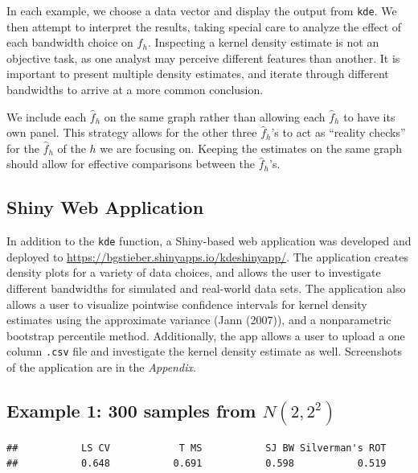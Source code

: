 \documentclass[]{article}
\begin{document}
In each example, we choose a data vector and display the output from
\texttt{kde}. We then attempt to interpret the results, taking special
care to analyze the effect of each bandwidth choice on \(\hat{f}_h\).
Inspecting a kernel density estimate is not an objective task, as one
analyst may perceive different features than another. It is important to
present multiple density estimates, and iterate through different
bandwidths to arrive at a more common conclusion.

We include each \(\hat f_h\) on the same graph rather than allowing each
\(\hat f_h\) to have its own panel. This strategy allows for the other
three \(\hat f_h\)'s to act as ``reality checks'' for the \(\hat f_h\)
of the \(h\) we are focusing on. Keeping the estimates on the same graph
should allow for effective comparisons between the \(\hat f_h\)'s.

\subsection{Shiny Web Application}

In addition to the \texttt{kde} function, a Shiny-based web application
was developed and deployed to
\url{https://bgstieber.shinyapps.io/kdeshinyapp/}. The application
creates density plots for a variety of data choices, and allows the user
to investigate different bandwidths for simulated and real-world data
sets. The application also allows a user to visualize pointwise
confidence intervals for kernel density estimates using the approximate
variance (Jann (2007)), and a nonparametric bootstrap percentile method.
Additionally, the app allows a user to upload a one column \texttt{.csv}
file and investigate the kernel density estimate as well. Screenshots of
the application are in the \emph{Appendix}.

\subsection{Example 1: 300 samples from $N(2, 2^2)$}

\begin{verbatim}
##           LS CV            T MS           SJ BW Silverman's ROT 
##           0.648           0.691           0.598           0.519
\end{verbatim}
\end{document}
